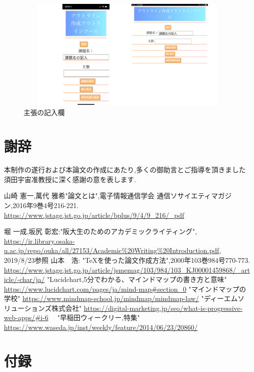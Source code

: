 \documentclass[a4j,12pt]{jarticle}
\begin{document}
\begin{figure}[h]
\begin{center}
 \includegraphics[clip,width=120mm,height=55mm]{pp00.pdf}
\end{center}
 \caption{主張の記入欄}
 \label{fig:q}
\end{figure}

\newpage

\section*{謝辞}
本制作の遂行および本論文の作成にあたり,多くの御助言とご指導を頂きました須田宇宙准教授に深く感謝の意を表します.


 \begin{thebibliography}{99}
山崎 憲一,萬代 雅希"論文とは",電子情報通信学会 通信ソサイエティマガジン,2016年9巻4号216-221.
\url{https://www.jstage.jst.go.jp/article/bplus/9/4/9_216/_pdf}

 堀 一成,坂尻 彰宏:"阪大生のためのアカデミックライティング",
\url{https://ir.library.osaka-u.ac.jp/repo/ouka/all/27153/Academic%20Writing%20Introduction.pdf}, 2019/8/23参照
 山本　浩: "TeXを使った論文作成方法",2000年103巻984号770-773.
\url{https://www.jstage.jst.go.jp/article/jsmemag/103/984/103_KJ00001459868/_article/-char/ja/}
 "Lucidchart,5分でわかる、マインドマップの書き方と意味"
\url{https://www.lucidchart.com/pages/ja/mind-map#section_0}
 "マインドマップの学校"
\url{https://www.mindmap-school.jp/mindmap/mindmap-law/}
 "ディーエムソリューションズ株式会社"
\url{https://digital-marketing.jp/seo/what-is-progressive-web-apps/#i-6}
　"早稲田ウィークリー,特集"
\url{https://www.waseda.jp/inst/weekly/feature/2014/06/23/20860/}
\end{thebibliography}
\newpage
\section*{付録}

\end{document}
